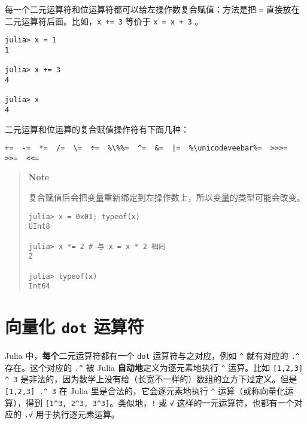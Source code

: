 每一个二元运算符和位运算符都可以给左操作数复合赋值：方法是把 \texttt{=} 直接放在二元运算符后面。比如，\texttt{x += 3} 等价于 \texttt{x = x + 3} 。




\begin{verbatim}
julia> x = 1
1

julia> x += 3
4

julia> x
4
\end{verbatim}



二元运算和位运算的复合赋值操作符有下面几种：




\begin{lstlisting}[escapeinside=\%\%]
+=  -=  *=  /=  \=  ÷=  %\%%=  ^=  &=  |=  %\unicodeveebar%=  >>>=  >>=  <<=
\end{lstlisting}



\begin{quote}
\textbf{Note}

复合赋值后会把变量重新绑定到左操作数上，所以变量的类型可能会改变。


\begin{verbatim}
julia> x = 0x01; typeof(x)
UInt8

julia> x *= 2 # 与 x = x * 2 相同
2

julia> typeof(x)
Int64
\end{verbatim}

\end{quote}


\hypertarget{6173297391052343261}{}


\section{向量化 \texttt{dot} 运算符}



Julia 中，\textbf{每个}二元运算符都有一个 \texttt{dot} 运算符与之对应，例如 \texttt{{\textasciicircum}} 就有对应的 \texttt{.{\textasciicircum}} 存在。这个对应的 \texttt{.{\textasciicircum}} 被 Julia \textbf{自动地}定义为逐元素地执行 \texttt{{\textasciicircum}} 运算。比如 \texttt{[1,2,3] {\textasciicircum} 3} 是非法的，因为数学上没有给（长宽不一样的）数组的立方下过定义。但是 \texttt{[1,2,3] .{\textasciicircum} 3} 在 Julia 里是合法的，它会逐元素地执行 \texttt{{\textasciicircum}} 运算（或称向量化运算），得到 \texttt{[1{\textasciicircum}3, 2{\textasciicircum}3, 3{\textasciicircum}3]}。类似地，\texttt{!} 或 \texttt{√} 这样的一元运算符，也都有一个对应的 \texttt{.√} 用于执行逐元素运算。




